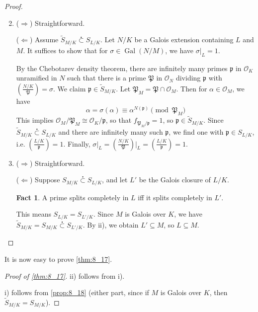 \documentclass[11pt]{article}
\theoremstyle{definition}
\newtheorem*{fact}{Fact}
\theoremstyle{plain}
\theoremstyle{remark}
\DeclareMathOperator{\Gal}{Gal}
\newcommand{\cO}{\mathcal{O}}
\newcommand{\cp}{\mathfrak{P}}
\newcommand{\fp}{\mathfrak{p}}
\newcommand{\leg}[2]{\left(\frac{#1}{#2}\right)}
\newcommand{\subsetdot}{\stackrel{\centerdot}{\subset}}
\begin{document}
\begin{proof}\phantom{}
    \begin{enumerate}[label=\roman*)]
        \setcounter{enumi}{1}
        \item ($\Rightarrow$) Straightforward.

            ($\Leftarrow$) Assume $\widetilde{S}_{M/K} \subsetdot S_{L/K}$. Let $N/K$ be a Galois extension containing $L$ and $M$. It suffices to show that for $\sigma \in \Gal(N/M)$, we have $\sigma \vert_L = 1$.

            By the Chebotarev density theorem, there are infinitely many primes $\fp$ in $\cO_K$ unramified in $N$ such that there is a prime $\cp$ in $\cO_N$ dividing $\fp$ with $\leg{N/K}{\cp} = \sigma$. We claim $\fp \in \widetilde{S}_{M/K}$. Let $\cp_M = \cp \cap \cO_M$. Then for $\alpha \in \cO_M$, we have
            \begin{equation*}
                \alpha = \sigma(\alpha) \equiv \alpha^{N(\fp)} \pmod{\cp_M}
            \end{equation*}
            This implies $\cO_M / \cp_M \cong \cO_K / \fp$, so that $f_{\cp_M / \fp} = 1$, so $\fp \in \widetilde{S}_{M/K}$. Since $\widetilde{S}_{M/K} \subsetdot S_{L/K}$ and there are infinitely many such $\fp$, we find one with $\fp \in S_{L/K}$, i.e. $\leg{L/K}{\fp} = 1$. Finally, $\sigma \vert_L = \leg{N/K}{\cp} \vert_L = \leg{L/K}{\fp} = 1$.

        \setcounter{enumi}{0}
    \item ($\Rightarrow$) Straightforward.

        ($\Leftarrow$) Suppose $S_{M/K} \subsetdot S_{L/K}$, and let $L'$ be the Galois closure of $L/K$.
            \begin{fact}
                A prime splits completely in $L$ iff it splits completely in $L'$.
            \end{fact}
            This means $S_{L/K} = S_{L'/K}$. Since $M$ is Galois over $K$, we have $\widetilde{S}_{M/K} = S_{M/K} \subsetdot S_{L'/K}$. By ii), we obtain $L' \subseteq M$, so $L \subseteq M$. \qedhere
    \end{enumerate}
\end{proof}

It is now easy to prove \autoref{thm:8_17}.
\begin{proof}[Proof of \autoref{thm:8_17}]
    ii) follows from i).

    i) follows from \autoref{prop:8_18} (either part, since if $M$ is Galois over $K$, then $\widetilde{S}_{M/K} = S_{M/K}$).
\end{proof}
\end{document}
